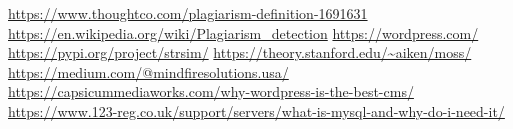 \makeatletter
\renewcommand{\chapter}{\@gobbletwo}
\makeatother
\begin{thebibliography}{}

 \url{https://www.thoughtco.com/plagiarism-definition-1691631}
 \url{ https://en.wikipedia.org/wiki/Plagiarism_detection}
 \url{https://wordpress.com/}
 \url{https://pypi.org/project/strsim/}
 \url{https://theory.stanford.edu/~aiken/moss/}
 \url{https://medium.com/@mindfiresolutions.usa/}
 \url{https://capsicummediaworks.com/why-wordpress-is-the-best-cms/}
 \url{https://www.123-reg.co.uk/support/servers/what-is-mysql-and-why-do-i-need-it/}
\end{thebibliography}